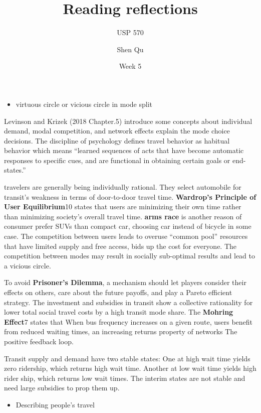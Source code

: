 \documentclass[12pt,]{article}
\title{Reading reflections}
\subtitle{USP 570}
\author{Shen Qu}
\date{Week 5}
\providecommand{\tightlist}{%
  \setlength{\itemsep}{0pt}\setlength{\parskip}{0pt}}
\begin{document}
\maketitle

\begin{itemize}
\tightlist
\item
  virtuous circle or vicious circle in mode split
\end{itemize}

Levinson and Krizek (2018 Chapter.5) introduce some concepts about
individual demand, modal competition, and network effects explain the
mode choice decisions. The discipline of psychology defines travel
behavior as habitual behavior which means ``learned sequences of acts
that have become automatic responses to specific cues, and are
functional in obtaining certain goals or end-states.''

travelers are generally being individually rational. They select
automobile for transit's weakness in terms of door-to-door travel time.
\textbf{Wardrop's Principle of User Equilibrium}10 states that users are
minimizing their own time rather than minimizing society's overall
travel time. \textbf{arms race} is another reason of consumer prefer
SUVs than compact car, choosing car instead of bicycle in some case. The
competition between users leads to overuse ``common pool'' resources
that have limited supply and free access, bids up the cost for everyone.
The competition between modes may result in socially sub-optimal results
and lead to a vicious circle.

To avoid \textbf{Prisoner's Dilemma}, a mechanism should let players
consider their effects on others, care about the future payoffs, and
play a Pareto efficient strategy. The investment and subsidies in
transit show a collective rationality for lower total social travel
costs by a high transit mode share. The \textbf{Mohring Effect}7 states
that When bus frequency increases on a given route, users benefit from
reduced waiting times, an increasing returns property of networks The
positive feedback loop.

Transit supply and demand have two stable states: One at high wait time
yields zero ridership, which returns high wait time. Another at low wait
time yields high rider ship, which returns low wait times. The interim
states are not stable and need large subsidies to prop them up.

\begin{itemize}
\tightlist
\item
  Describing people's travel
\end{itemize}
\end{document}
